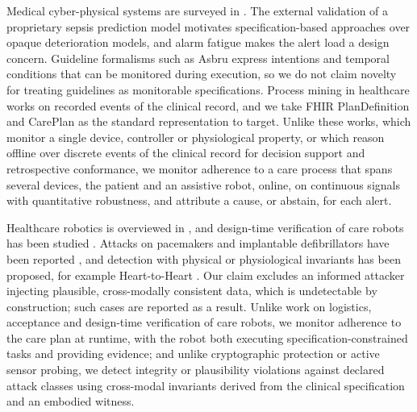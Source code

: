 Medical cyber-physical systems are surveyed in \cite{lee-sokolsky-medical-cps}. The external validation of a proprietary sepsis prediction model \cite{wong-sepsis-external-validation} motivates specification-based approaches over opaque deterioration models, and alarm fatigue \cite{sendelbach-funk-alarm-fatigue} makes the alert load a design concern.
Guideline formalisms such as Asbru \cite{shahar-miksch-johnson-asbru} express intentions and temporal conditions that can be monitored during execution, so we do not claim novelty for treating guidelines as monitorable specifications. Process mining in healthcare \cite{munoz-gama-process-mining-healthcare} works on recorded events of the clinical record, and we take FHIR PlanDefinition and CarePlan \cite{hl7-fhir-plandefinition} as the standard representation to target.
Unlike these works, which monitor a single device, controller or physiological property, or which reason offline over discrete events of the clinical record for decision support and retrospective conformance, we monitor adherence to a care process that spans several devices, the patient and an assistive robot, online, on continuous signals with quantitative robustness, and attribute a cause, or abstain, for each alert.

Healthcare robotics is overviewed in \cite{riek-healthcare-robotics}, and design-time verification of care robots has been studied \cite{dixon-webster-care-robot-verification}. Attacks on pacemakers and implantable defibrillators have been reported \cite{halperin-pacemaker-icd}, and detection with physical or physiological invariants has been proposed, for example Heart-to-Heart \cite{rostami-heart-to-heart}. Our claim excludes an informed attacker injecting plausible, cross-modally consistent data, which is undetectable by construction; such cases are reported as a result.
Unlike work on logistics, acceptance and design-time verification of care robots, we monitor adherence to the care plan at runtime, with the robot both executing specification-constrained tasks and providing evidence; and unlike cryptographic protection or active sensor probing, we detect integrity or plausibility violations against declared attack classes using cross-modal invariants derived from the clinical specification and an embodied witness.
